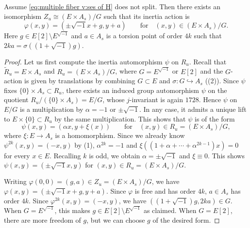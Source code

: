\documentclass[reqno, letterpaper]{amsart}
\numberwithin{equation}{subsection}
\let\to\longrightarrow
\begin{document}
		\begin{lemma} \label{lem:multiple fiber v:varphi-action nonsplit}
			Assume \eqref{eq:multiple fiber v:ses of H} does not split. Then there exists an isomorphism $Z_u \cong (E \times A_s)/G$ such that its inertia action is
			\[ \varphi (x,y) = (\pm \sqrt{-1} x + g, y + a) \qquad\mbox{for}\quad (x,y) \in (E \times A_s)/G .\]
			Here $g \in E[2] \setminus E^{\sqrt{-1}}$ and $a \in A_s$ is a torsion point of order $4k$ such that $2ka = \sigma((1+\sqrt{-1})g)$.
		\end{lemma}
		\begin{proof}
			Let us first compute the inertia automorphism $\psi$ on $R_u$. Recall that $\tilde R_u = E \times A_s$ and $R_u = (E \times A_s)/G$, where $G = E^{\sqrt{-1}}$ or $E[2]$ and the $G$-action is given by translations by combining $G \subset E$ and $\sigma : G \hookrightarrow A_s$ ((2)). Since $\psi$ fixes $\{ 0 \} \times A_s \subset R_u$, there exists an induced group automorphism $\psi$ on the quotient $R_u / (\{ 0 \} \times A_s) = E/G$, whose $j$-invariant is again $1728$. Hence $\psi$ on $E/G$ is a multiplication by $\alpha = -1$ or $\pm \sqrt{-1}$. In any case, it admits a unique lift to $E \times \{ 0 \} \subset R_u$ by the same multiplication. This shows that $\psi$ is of the form
			\[ \psi (x,y) = (\alpha x, y + \xi(x)) \qquad\mbox{for}\quad (x,y) \in R_u = (E \times A_s)/G ,\]
			where $\xi : E \to A_s$ is a homomorphism. Since we already know $\psi^{2k} (x,y) = (-x,y)$ by (1), $\alpha^{2k} = -1$ and $\xi((1+\alpha + \cdots + \alpha^{2k-1}) x) = 0$ for every $x \in E$. Recalling $k$ is odd, we obtain $\alpha = \pm \sqrt{-1}$ and $\xi \equiv 0$. This shows $\psi (x,y) = (\pm \sqrt{-1} x, y)$ for $(x,y) \in R_u = (E \times A_s)/G$.
			
			\medskip
			
			Writing $\varphi(0,0) = (g, a) \in Z_u = (E \times A_s)/G$, we have $\varphi (x,y) = (\pm \sqrt{-1} x + g, y + a)$. Since $\varphi$ is free and has order $4k$, $a \in A_s$ has order $4k$. Since $\varphi^{2k}(x,y) = (-x,y)$, we have $((1+\sqrt{-1})g, 2ka) \in G$. When $G = E^{\sqrt{-1}}$, this makes $g \in E[2] \setminus E^{\sqrt{-1}}$ as claimed. When $G = E[2]$, there are more freedom of $g$, but we can choose $g$ of the desired form.
		\end{proof}
		
\end{document}
